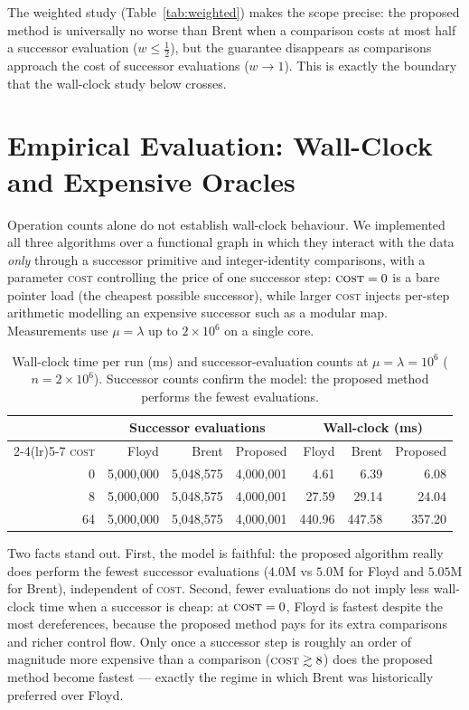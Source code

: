 \documentclass[11pt]{article}
\begin{document}
The weighted study (Table~\ref{tab:weighted}) makes the scope precise: the
proposed method is universally no worse than Brent when a comparison costs at most
half a successor evaluation ($w\le\tfrac12$), but the guarantee disappears as
comparisons approach the cost of successor evaluations ($w\to1$). This is exactly
the boundary that the wall-clock study below crosses.

\section{Empirical Evaluation: Wall-Clock and Expensive Oracles}
\label{sec:wallclock}

Operation counts alone do not establish wall-clock behaviour. We implemented all
three algorithms over a functional graph in which they interact with the data
\emph{only} through a successor primitive and integer-identity comparisons, with a
parameter \textsc{cost} controlling the price of one successor step:
$\textsc{cost}=0$ is a bare pointer load (the cheapest possible successor), while
larger \textsc{cost} injects per-step arithmetic modelling an expensive successor
such as a modular map. Measurements use $\mu=\lambda$ up to $2\times10^6$ on a
single core.

\begin{table}[H]\centering
\caption{Wall-clock time per run (ms) and successor-evaluation counts at
$\mu=\lambda=10^6$ ($n=2\times10^6$). Successor counts confirm the model:
the proposed method performs the fewest evaluations.}
\label{tab:wallclock}
\begin{tabular}{rrrrrrr}
\toprule
 & \multicolumn{3}{c}{Successor evaluations} & \multicolumn{3}{c}{Wall-clock (ms)} \\
\cmidrule(lr){2-4}\cmidrule(lr){5-7}
\textsc{cost} & Floyd & Brent & Proposed & Floyd & Brent & Proposed \\
\midrule
0  & 5{,}000{,}000 & 5{,}048{,}575 & 4{,}000{,}001 & 4.61 & 6.39 & 6.08 \\
8  & 5{,}000{,}000 & 5{,}048{,}575 & 4{,}000{,}001 & 27.59 & 29.14 & 24.04 \\
64 & 5{,}000{,}000 & 5{,}048{,}575 & 4{,}000{,}001 & 440.96 & 447.58 & 357.20 \\
\bottomrule
\end{tabular}
\end{table}

Two facts stand out. First, the model is faithful: the proposed algorithm really
does perform the fewest successor evaluations ($4.0\text{M}$ vs $5.0\text{M}$ for
Floyd and $5.05\text{M}$ for Brent), independent of \textsc{cost}. Second, fewer
evaluations do not imply less wall-clock time when a successor is cheap: at
$\textsc{cost}=0$, Floyd is fastest despite the most dereferences, because the
proposed method pays for its extra comparisons and richer control flow. Only once
a successor step is roughly an order of magnitude more expensive than a
comparison ($\textsc{cost}\gtrsim8$) does the proposed method become fastest ---
exactly the regime in which Brent was historically preferred over Floyd.
\end{document}
